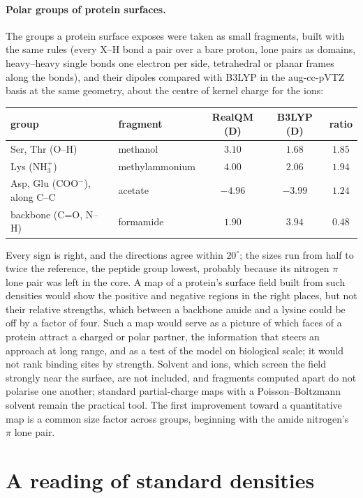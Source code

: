 \paragraph{Polar groups of protein surfaces.} The groups a protein surface exposes were taken as small fragments, built
with the same rules (every X--H bond a pair over a bare proton, lone pairs as domains, heavy--heavy single bonds one
electron per side, tetrahedral or planar frames along the bonds), and their dipoles compared with B3LYP in the
aug-cc-pVTZ basis at the same geometry, about the centre of kernel charge for the ions:
\begin{center}
\small
\begin{tabular}{llccc}
\toprule
group & fragment & RealQM (D) & B3LYP (D) & ratio \\
\midrule
Ser, Thr (O--H) & methanol & $3.10$ & $1.68$ & $1.85$ \\
Lys (NH$_3^+$) & methylammonium & $4.00$ & $2.06$ & $1.94$ \\
Asp, Glu (COO$^-$), along C--C & acetate & $-4.96$ & $-3.99$ & $1.24$ \\
backbone (C=O, N--H) & formamide & $1.90$ & $3.94$ & $0.48$ \\
\bottomrule
\end{tabular}
\end{center}
Every sign is right, and the directions agree within $20^\circ$; the sizes run from half to twice the reference, the
peptide group lowest, probably because its nitrogen $\pi$ lone pair was left in the core. A map of a protein's
surface field built from such densities would show the positive and negative regions in the right places, but not
their relative strengths, which between a backbone amide and a lysine could be off by a factor of four. Such a map
would serve as a picture of which faces of a protein attract a charged or polar partner, the information that
steers an approach at long range, and as a test of the model on biological scale; it would not rank binding sites
by strength. Solvent and ions, which screen the field strongly near the surface, are not included, and fragments
computed apart do not polarise one another; standard partial-charge maps with a Poisson--Boltzmann solvent remain the
practical tool. The first improvement toward a quantitative map is a common size factor across groups, beginning
with the amide nitrogen's $\pi$ lone pair.

\section{A reading of standard densities}\label{sec:hydride-analysis}

